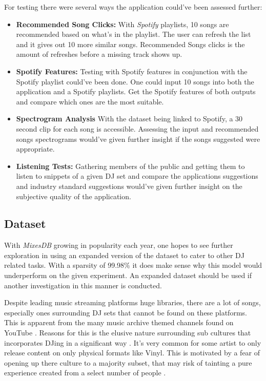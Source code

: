 For testing there were several ways the application could've been assessed further:
\begin{itemize}
	
\item \textbf{Recommended Song Clicks:} With \textit{Spotify} playlists, 10 songs are recommended based on what's in the playlist. The user can refresh the list and it gives out 10 more similar songs. Recommended Songs clicks is the amount of refreshes before a missing track shows up.

\item \textbf{Spotify Features:} Testing with Spotify features in conjunction with the Spotify playlist could've been done. One could input 10 songs into both the  application and a Spotify playlists. Get the Spotify features of both outputs and compare which ones are the most suitable.

\item \textbf{Spectrogram Analysis} With the dataset being linked to Spotify, a 30 second clip for each song is accessible. Assessing the input and recommended songs spectrograms would've given further insight if the songs suggested were appropriate.

\item \textbf{Listening Tests:} Gathering members of the public and getting them to listen to snippets of a given DJ set and compare the applications suggestions and industry standard suggestions would've given further insight on the subjective quality of the application.
\end{itemize}

\subsection{Dataset}
With \textit{MixesDB} growing in popularity each year, one hopes to see further exploration in using an expanded version of the dataset to cater to other DJ related tasks. With a sparsity of 99.98\% it does make sense why this model would underperform on the given experiment. An expanded dataset should be used if another investigation in this manner is conducted. 

Despite leading music streaming platforms huge libraries, there are a lot of songs, especially ones surrounding DJ sets that cannot be found on these platforms. This is apparent from the many music archive themed channels found on YouTube \citep{allen_djs_2021}.  Reasons for this is the elusive nature surrounding sub cultures that incorporates DJing in a significant way \citep{reynolds_energy_2013}. It's very common for some artist to only release content on only physical formats like Vinyl. This is motivated by a fear of opening up there culture to a majority subset, that may risk of tainting a pure experience created from a select number of people \citep{wheeler_gentrification_2020}. 

